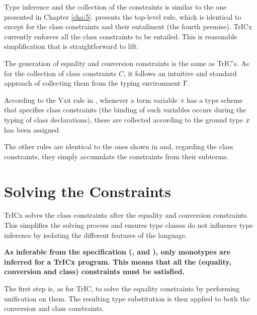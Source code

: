 Type inference and the collection of the constraints is similar to the one presented in Chapter \ref{cha:5}.  presents the top-level rule, which is identical to  except for the class constraints and their entailment (the fourth premise). TrICx currently enforces all the class constraints to be entailed. This is reasonable simplification that is straightforward to lift.

The generation of equality and conversion constraints is the same as TrIC's. As for the collection of class constraints $C$, it follows an intuitive and standard approach of collecting them from the typing environment $\Gamma$.

According to the \textsc{Var} rule in , whenever a term variable $\mathit{x}$ has a type scheme that specifies class constraints (the binding of such variables occurs during the typing of class declarations), these are collected according to the ground type $\mathit{x}$ has been assigned.

The other rules are identical to the ones shown in  and, regarding the class constraints, they simply accumulate the constraints from their subterms.
\section{Solving the Constraints}
\label{clssolving}

TrICx solves the class constraints after the equality and conversion constraints. This simplifies the solving process and ensures type classes do not influence type inference by isolating the different features of the language.

\textbf{As inferable from the specification (,  and ), only monotypes are inferred for a TrICx program. This means that all the (equality, conversion and class) constraints must be satisfied.}

The first step is, as for TrIC, to solve the equality constraints by performing unification on them. The resulting type substitution is then applied to both the conversion and class constraints.

